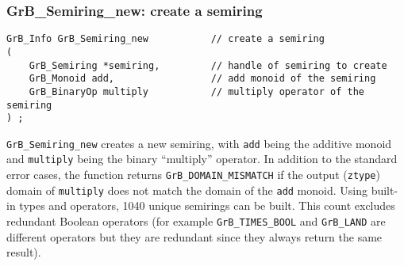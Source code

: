 \documentclass[12pt]{article}
\begin{document}
\subsubsection{{\sf GrB\_Semiring\_new:} create a semiring}
\label{semiring_new}

\begin{mdframed}[userdefinedwidth=6in]
{\footnotesize
\begin{verbatim}
GrB_Info GrB_Semiring_new           // create a semiring
(
    GrB_Semiring *semiring,         // handle of semiring to create
    GrB_Monoid add,                 // add monoid of the semiring
    GrB_BinaryOp multiply           // multiply operator of the semiring
) ;
\end{verbatim}
} \end{mdframed}

\verb'GrB_Semiring_new' creates a new semiring, with \verb'add' being the
additive monoid and \verb'multiply' being the binary ``multiply'' operator.  In
addition to the standard error cases, the function returns
\verb'GrB_DOMAIN_MISMATCH' if the output (\verb'ztype') domain of
\verb'multiply' does not match the domain of the \verb'add' monoid.  Using
built-in types and operators, 1040 unique semirings can be built.  This count
excludes redundant Boolean operators (for example \verb'GrB_TIMES_BOOL' and
\verb'GrB_LAND' are different operators but they are redundant since they
always return the same result).
\end{document}
